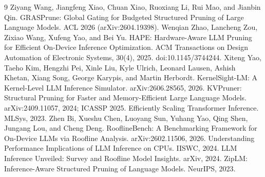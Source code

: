 \documentclass[11pt]{article}
\begin{document}

\begin{thebibliography}{9}\small
{} Ziyang Wang,
Jiangfeng Xiao, Chuan Xiao, Ruoxiang Li, Rui Mao, and Jianbin
Qin. GRASPrune: Global Gating
for Budgeted Structured Pruning of Large Language Models.
ACL 2026 (arXiv:2604.19398).
 Wenqian Zhao, Lancheng Zou,
Zixiao Wang, Xufeng Yao, and Bei Yu. HAPE: Hardware-Aware LLM Pruning
for Efficient On-Device Inference Optimization. ACM Transactions
on Design Automation of Electronic Systems, 30(4), 2025.
doi:10.1145/3744244.
 Xiteng Yao, Taeho Kim,
Hengzhi Pei, Xinle Liu, Kyle Ulrich, Leonard Lausen, Ashish
Khetan, Xiang Song, George Karypis, and Martin Herbordt.
KernelSight-LM: A
Kernel-Level LLM Inference Simulator. arXiv:2606.28565, 2026.
 KVPruner: Structural
Pruning for Faster and Memory-Efficient Large Language Models.
arXiv:2409.11057, 2024; ICASSP 2025.
 Efficiently Scaling
Transformer Inference. MLSys, 2023.
 Zhen Bi, Xueshu Chen,
Luoyang Sun, Yuhang Yao, Qing Shen, Jungang Lou, and Cheng Deng.
RooflineBench: A
Benchmarking Framework for On-Device LLMs via Roofline Analysis.
arXiv:2602.11506, 2026.
 Understanding
Performance Implications of LLM Inference on CPUs. IISWC, 2024.
 LLM Inference Unveiled:
Survey and Roofline Model Insights. arXiv, 2024.
 ZipLM: Inference-Aware
Structured Pruning of Language Models. NeurIPS, 2023.
\end{thebibliography}
\end{document}
